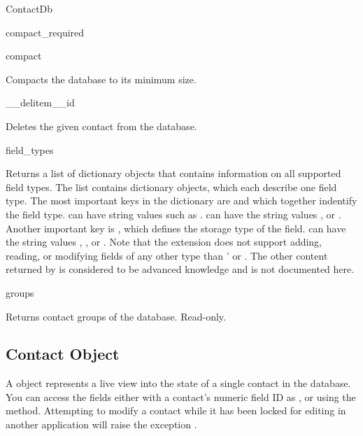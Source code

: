 \begin{classdesc*}{ContactDb}
\begin{methoddesc}[ContactDb]{compact_required}{}
\end{methoddesc}

\begin{methoddesc}[ContactDb]{compact}{}

Compacts the database to its minimum size.

\end{methoddesc}

\begin{methoddesc}[ContactDb]{__delitem__}{id}

Deletes the given contact from the database.

\end{methoddesc}


\begin{methoddesc}[ContactDb]{field_types}{}

Returns a list of dictionary objects that contains information on all 
supported field types. The list contains dictionary objects, which each 
describe one field type. The most important keys in the dictionary are 
 and  which together indentify the field 
type.  can have string values such as 
.  can have the string values 
,  or . Another important key 
is , which defines the storage type of the field. 
 can have the string values , 
,  or . Note that 
the  extension does not support adding, reading, or 
modifying fields of any other type than ' or 
. The other content returned by  
is considered to be advanced knowledge and is not documented here.

\end{methoddesc}

\begin{memberdesc}[ContactDb]{groups}

Returns contact groups of the database. Read-only.

\end{memberdesc}

\end{classdesc*}

\subsection{Contact Object}
\label{subsec:contact}

A  object represents a live view into the state of a single 
contact in the database. You can access the fields either with a contact's 
numeric field ID as , or using the  
method. Attempting to modify a contact while it has been locked for editing 
in another application will raise the exception .

